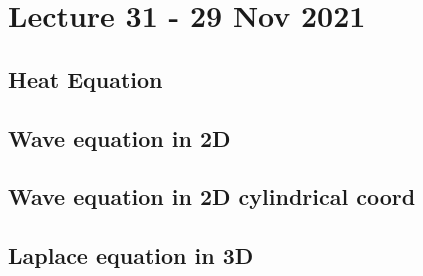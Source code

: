 \section{Lecture 31 - 29 Nov 2021}
\subsection{Heat Equation}
\subsection{Wave equation in 2D}
\subsection{Wave equation in 2D cylindrical coord}
\subsection{Laplace equation in 3D}
